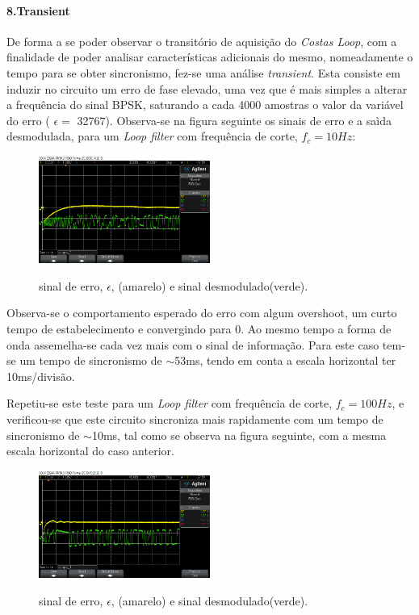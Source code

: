 \documentclass[11pt]{article}
\numberwithin{equation}{section}
\begin{document}
\paragraph{8.Transient} \hspace{0pt}

De forma a se poder observar o transitório de aquisição do \textit{Costas Loop}, com a finalidade de poder analisar características adicionais do mesmo, nomeadamente o tempo para se obter sincronismo, fez-se uma análise \textit{transient}. Esta consiste em induzir no circuito um erro de fase elevado, uma vez que é mais simples a alterar a frequência do sinal BPSK, saturando a cada 4000 amostras o valor da variável do erro ( $\epsilon=$ 32767). Observa-se na figura seguinte os sinais de erro e a saìda desmodulada, para um \textit{Loop filter} com frequência de corte, $f_c = 10Hz$:

\begin{figure}[H]
	\centering
	\includegraphics[width=0.5\textwidth]{./transient10Hz}~\\
	\caption{sinal de erro, $\epsilon$, (amarelo) e sinal desmodulado(verde).}
	\label{trans10}
\end{figure}
Observa-se o comportamento esperado do erro com algum overshoot, um curto tempo de estabelecimento e convergindo para 0. Ao mesmo tempo a forma de onda assemelha-se cada vez mais com o sinal de informação. Para este caso tem-se um tempo de sincronismo de $\sim$53ms, tendo em conta a escala horizontal ter 10ms/divisão.

Repetiu-se este teste para um \textit{Loop filter} com frequência de corte, $f_c = 100Hz$, e verificou-se que este circuito sincroniza mais rapidamente com um tempo de sincronismo de $\sim$10ms, tal como se observa na figura seguinte, com a mesma escala horizontal do caso anterior.

\begin{figure}[H]
	\centering
	\includegraphics[width=0.5\textwidth]{./transient100Hz}~\\
	\caption{sinal de erro, $\epsilon$, (amarelo) e sinal desmodulado(verde).}
	\label{trans100}
\end{figure}
\end{document}
